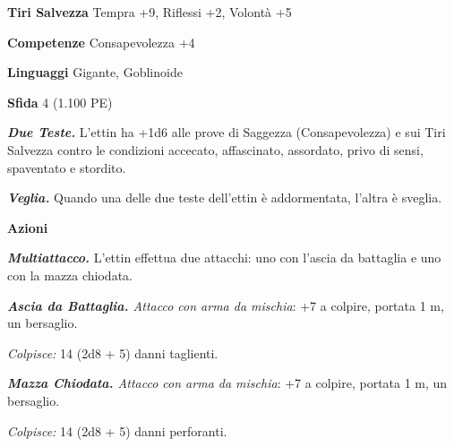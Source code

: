 \begin{multicols}{2}
\textbf{Tiri Salvezza} Tempra +9, Riflessi +2, Volontà +5

\textbf{Competenze} Consapevolezza +4

\textbf{Linguaggi} Gigante, Goblinoide

\textbf{Sfida} 4 (1.100 PE)

\emph{\textbf{Due Teste.}} L'ettin ha +1d6 alle prove di Saggezza (Consapevolezza) e sui Tiri Salvezza contro le condizioni accecato, affascinato, assordato, privo di sensi, spaventato e stordito.

\emph{\textbf{Veglia.}} Quando una delle due teste dell'ettin è addormentata, l'altra è sveglia.

\textbf{Azioni}

\emph{\textbf{Multiattacco.}} L'ettin effettua due attacchi: uno con l'ascia da battaglia e uno con la mazza chiodata.

\emph{\textbf{Ascia da Battaglia.} Attacco con arma da mischia}: +7 a colpire, portata 1 m, un bersaglio.

\emph{Colpisce:} 14 (2d8 + 5) danni taglienti.

\emph{\textbf{Mazza Chiodata.} Attacco con arma da mischia}: +7 a colpire, portata 1 m, un bersaglio.

\emph{Colpisce:} 14 (2d8 + 5) danni perforanti.


\end{multicols}
